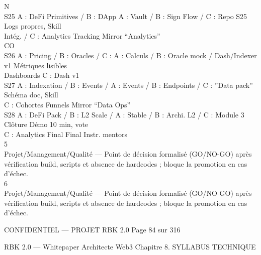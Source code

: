 \documentclass[12pt,landscape,a4paper]{article}
\newenvironment{confidential}
{\begin{tcolorbox}[
    colback=rbkred!5!white,
    colframe=rbkred!75!black,
    title=CONFIDENTIEL,
    fonttitle=\bfseries\color{white},
    coltitle=rbkred!75!black,
    breakable,
    enhanced,
    frame hidden,
    borderline west={2pt}{0pt}{rbkred!75!black}
]}
{\end{tcolorbox}}
\begin{document}
\vspace{0.5em}
\vspace{0.5em}
N\\
S25 A : DeFi Primitives / B : DApp A : Vault / B : Sign Flow / C : Repo S25                       Logs propres, Skill\\
Intég. / C : Analytics           Tracking                                                     Mirror “Analytics”\\
CO\\
S26 A : Pricing / B : Oracles / C : A : Calculs / B : Oracle mock / Dash/Indexer v1               Métriques lisibles\\
Dashboards                       C : Dash v1\\
S27 A : Indexation / B : Events /    A : Events / B : Endpoints / C : ”Data pack”                 Schéma doc, Skill\\
C : Cohortes                     Funnels                                                      Mirror “Data Ops”\\
S28 A : DeFi Pack / B : L2 Scale / A : Stable / B : Archi. L2 / C : Module 3 Clôture              Démo 10 min, vote\\
C : Analytics Final              Final Instr.                                                 mentors\\
\vspace{0.5em}
\vspace{0.5em}
\vspace{0.5em}
\vspace{0.5em}
5\\
Projet/Management/Qualité — Point de décision formalisé (GO/NO-GO) après vérification build, scripts et absence de hardcodes ; bloque la promotion en cas d’échec.\\
6\\
Projet/Management/Qualité — Point de décision formalisé (GO/NO-GO) après vérification build, scripts et absence de hardcodes ; bloque la promotion en cas d’échec.\\
\vspace{0.5em}
\vspace{0.5em}
\begin{confidential}CONFIDENTIEL — PROJET RBK 2.0                                            Page 84 sur 316\end{confidential}
RBK 2.0 — Whitepaper Architecte Web3                                                                                      Chapitre 8. SYLLABUS TECHNIQUE\\
\end{document}
